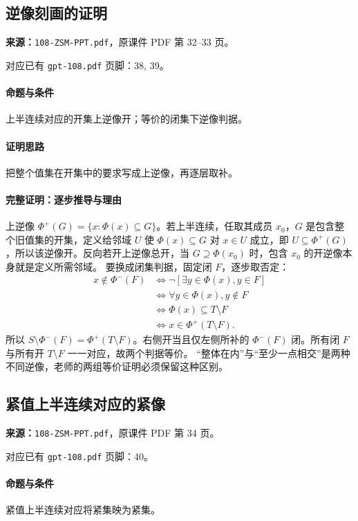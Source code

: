 \clearpage\subsection{逆像刻画的证明}
\textbf{来源：}\texttt{108-ZSM-PPT.pdf}，原课件 PDF 第 32--33 页。\par
对应已有 \texttt{gpt-108.pdf} 页脚：38, 39。\par
\paragraph{命题与条件}上半连续对应的开集上逆像开；等价的闭集下逆像判据。
\paragraph{证明思路}把整个值集在开集中的要求写成上逆像，再逐层取补。
\paragraph{完整证明：逐步推导与理由}

上逆像 $\Phi^+(G)=\{x:\Phi(x)\subseteq G\}$。若上半连续，任取其成员 $x_0$，$G$ 是包含整个旧值集的开集，定义给邻域 $U$ 使 $\Phi(x)\subseteq G$ 对 $x\in U$ 成立，即 $U\subseteq\Phi^+(G)$，所以该逆像开。反向若开上逆像总开，当 $G\supseteq\Phi(x_0)$ 时，包含 $x_0$ 的开逆像本身就是定义所需邻域。
要换成闭集判据，固定闭 $F$，逐步取否定：
\begin{align*}
x\notin\Phi^-(F)&\iff\neg[\exists y\in\Phi(x),y\in F]\\
&\iff\forall y\in\Phi(x),y\notin F\\
&\iff\Phi(x)\subseteq T\setminus F\\
&\iff x\in\Phi^+(T\setminus F).
\end{align*}
所以 $S\setminus\Phi^-(F)=\Phi^+(T\setminus F)$。右侧开当且仅左侧所补的 $\Phi^-(F)$ 闭。所有闭 $F$ 与所有开 $T\setminus F$ 一一对应，故两个判据等价。
“整体在内”与“至少一点相交”是两种不同逆像，老师的两组等价证明必须保留这种区别。

\clearpage\subsection{紧值上半连续对应的紧像}
\textbf{来源：}\texttt{108-ZSM-PPT.pdf}，原课件 PDF 第 34 页。\par
对应已有 \texttt{gpt-108.pdf} 页脚：40。\par
\paragraph{命题与条件}紧值上半连续对应将紧集映为紧集。
